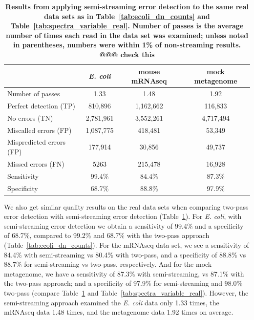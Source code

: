 \documentclass{article}
\begin{document}
\begin{table}
\begin{tabular}{|l|c||c||c|}
\hline
& {\bf \em E. coli} & {\bf mouse mRNAseq} & {\bf mock metagenome} \\
\hline
Number of passes         & 1.33      & 1.48         & 1.92 \\
\hline
Perfect detection (TP)   & 810,896   & 1,162,662  & 116,833  \\
No errors (TN)           & 2,781,961 & 3,552,261  & 4,717,494 \\
Miscalled errors (FP)    & 1,087,775 & 418,481    & 53,349   \\
Mispredicted errors (FP) & 177,914   & 30,856     & 49,737  \\
Missed errors (FN)       & 5263      & 215,478    & 16,928  \\
\hline
Sensitivity            & 99.4\%      & 84.4\%     & 87.3\%  \\
Specificity            & 68.7\%      & 88.8\%     & 97.9\%  \\
\hline
\end{tabular}
\caption{{\bf Results from applying semi-streaming error detection to the same
  real data sets as in Table~\ref{tab:ecoli_dn_counts} and
  Table~\ref{tab:spectra_variable_real}.  Number of passes is the average
  number of times each read in the data set was examined; unless noted in
  parentheses, numbers were within 1\% of non-streaming results. @@@ check this}}
\label{tab:spectra_streaming_real}


\end{table}

We also get similar quality results on the real data sets when
comparing two-pass error detection with semi-streaming error detection
(Table~\ref{tab:spectra_streaming_real}).  For {\em E. coli}, with
semi-streaming error detection we obtain a sensitivity of 99.4\% and a
specificity of 68.7\%, compared to 99.2\% and 68.7\% with the two-pass
approach (Table~\ref{tab:ecoli_dn_counts}).  For the mRNAseq data set,
we see a sensitivity of 84.4\% with semi-streaming vs 80.4\% with two-pass,
and a specificity of 88.8\% vs 88.7\% for semi-streaming vs two-pass,
respectively.  And for the mock metagenome, we have a sensitivity of
87.3\% with semi-streaming, vs 87.1\% with the two-pass approach; and a
specificity of 97.9\% for semi-streaming and 98.0\% two-pass (compare
Table~\ref{tab:spectra_streaming_real} and
Table~\ref{tab:spectra_variable_real}).  However, the semi-streaming
approach examined the {\em E. coli} data only 1.33 times, the mRNAseq
data 1.48 times, and the metagenome data 1.92 times on average.
\end{document}
